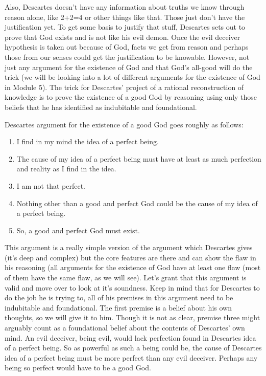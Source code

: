 Also, Descartes doesn't have any information about truths we know through reason alone, like 2+2=4 or other things like that. Those just don't have the justification yet. To get some basis to justify that stuff, Descartes sets out to prove that God exists and is not like his evil demon. Once the evil deceiver hypothesis is taken out because of God, facts we get from reason and perhaps those from our senses could get the justification to be knowable. However, not just any argument for the existence of God and that God's all-good will do the trick (we will be looking into a lot of different arguments for the existence of God in Module 5). The trick for Descartes’ project of a rational reconstruction of knowledge is to prove the existence of a good God by reasoning using only those beliefs that he has identified as indubitable and foundational.

Descartes argument for the existence of a good God goes roughly as follows:
\begin{enumerate}
    \item I find in my mind the idea of a perfect being.
    \item The cause of my idea of a perfect being must have at least as much perfection and reality as I find in the idea.
    \item I am not that perfect.
    \item Nothing other than a good and perfect God could be the cause of my idea of a perfect being.
    \item So, a good and perfect God must exist.
\end{enumerate}
This argument is a really simple version of the argument which Descartes gives (it's deep and complex) but the core features are there and can show the flaw in his reasoning (all arguments for the existence of God have at least one flaw (most of them have the same flaw, as we will see). Let's grant that this argument is valid and move over to look at it's soundness. Keep in mind that for Descartes to do the job he is trying to, all of his premises in this argument need to be indubitable and foundational. The first premise is a belief about his own thoughts, so we will give it to him. Though it is not as clear, premise three might arguably count as a foundational belief about the contents of Descartes' own mind. An evil deceiver, being evil, would lack perfection found in Descartes idea of a perfect being. So as powerful as such a being could be, the cause of Descartes idea of a perfect being must be more perfect than any evil deceiver. Perhaps any being so perfect would have to be a good God.

